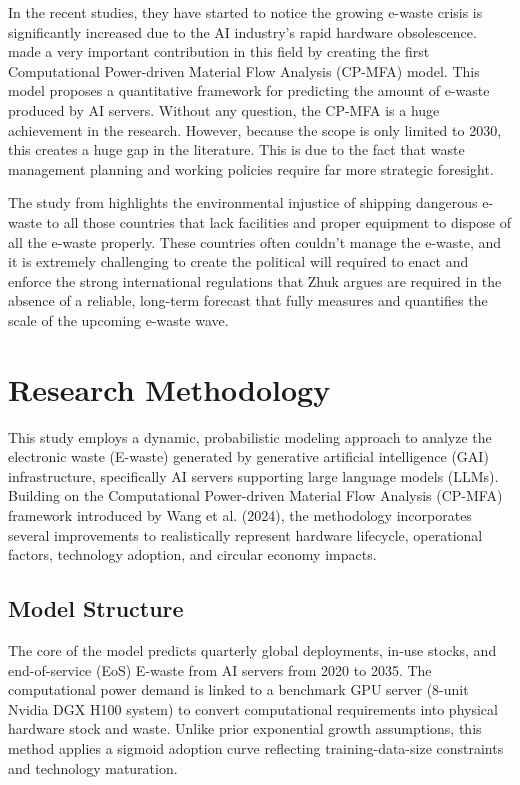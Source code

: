 \documentclass[a4paper, 12pt]{article}
\begin{document}
In the recent studies, they have started to notice the growing e-waste crisis is significantly increased due to the AI industry's rapid hardware obsolescence. \citet{wang_2024_ewaste} made a very important contribution in this field by creating the first Computational Power-driven Material Flow Analysis (CP-MFA) model. This model proposes a quantitative framework for predicting the amount of e-waste produced by AI servers. Without any question, the CP-MFA is a huge achievement in the research. However, because the scope is only limited to 2030, this creates a huge gap in the literature. This is due to the fact that waste management planning and working policies require far more strategic foresight. 

The study from \citet{Zhuk2023} highlights the environmental injustice of shipping dangerous e-waste to all those countries that lack facilities and proper equipment to dispose of all the e-waste properly. These countries often couldn't manage the e-waste, and it is extremely challenging to create the political will required to enact and enforce the strong international regulations that Zhuk argues are required in the absence of a reliable, long-term forecast that fully measures and quantifies the scale of the upcoming e-waste wave.

\section{Research Methodology}
This study employs a dynamic, probabilistic modeling approach to analyze the electronic waste (E-waste) generated by generative artificial intelligence (GAI) infrastructure, specifically AI servers supporting large language models (LLMs). Building on the Computational Power-driven Material Flow Analysis (CP-MFA) framework introduced by Wang et al. (2024), the methodology incorporates several improvements to realistically represent hardware lifecycle, operational factors, technology adoption, and circular economy impacts.

\subsection{Model Structure}
The core of the model predicts quarterly global deployments, in-use stocks, and end-of-service (EoS) E-waste from AI servers from 2020 to 2035. The computational power demand is linked to a benchmark GPU server (8-unit Nvidia DGX H100 system) to convert computational requirements into physical hardware stock and waste. Unlike prior exponential growth assumptions, this method applies a sigmoid adoption curve reflecting training-data-size constraints and technology maturation.
\end{document}
